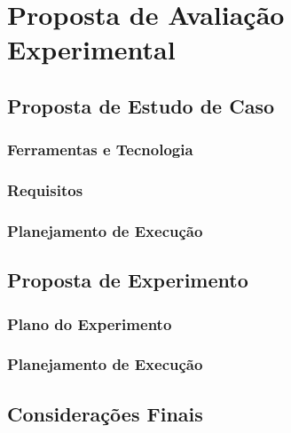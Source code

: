 \chapter{Proposta de Avaliação Experimental}\label{cap:avalia}

\section{Proposta de Estudo de Caso}

\subsection{Ferramentas e Tecnologia}
\subsection{Requisitos}
\subsection{Planejamento de Execução}

\section{Proposta de Experimento}

\subsection{Plano do Experimento}
\subsection{Planejamento de Execução}

\section{Considerações Finais}


